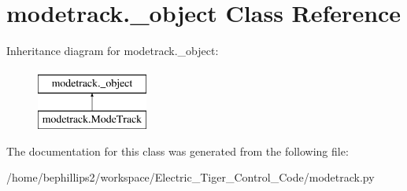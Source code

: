 \hypertarget{classmodetrack_1_1__object}{\section{modetrack.\-\_\-object Class Reference}
\label{classmodetrack_1_1__object}
}
Inheritance diagram for modetrack.\-\_\-object\-:\begin{figure}[H]
\begin{center}
\leavevmode
\includegraphics[height=2.000000cm]{classmodetrack_1_1__object}
\end{center}
\end{figure}


The documentation for this class was generated from the following file\-:\begin{DoxyCompactItemize}
\item 
/home/bephillips2/workspace/\-Electric\-\_\-\-Tiger\-\_\-\-Control\-\_\-\-Code/modetrack.\-py\end{DoxyCompactItemize}
